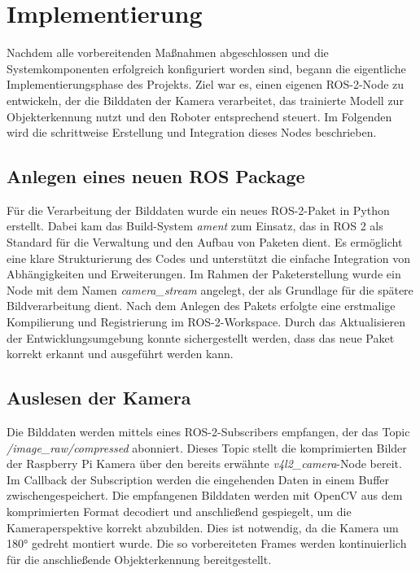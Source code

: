 \section{Implementierung}
Nachdem alle vorbereitenden Maßnahmen abgeschlossen und die Systemkomponenten erfolgreich konfiguriert worden sind, begann die eigentliche Implementierungsphase des Projekts. 
Ziel war es, einen eigenen ROS-2-Node zu entwickeln, der die Bilddaten der Kamera verarbeitet, das trainierte Modell zur Objekterkennung nutzt und den Roboter entsprechend steuert.
Im Folgenden wird die schrittweise Erstellung und Integration dieses Nodes beschrieben.
\subsection{Anlegen eines neuen ROS Package}
Für die Verarbeitung der Bilddaten wurde ein neues ROS-2-Paket in Python erstellt. 
Dabei kam das Build-System \textit{ament} zum Einsatz, das in ROS 2 als Standard für die Verwaltung und den Aufbau von Paketen dient. 
Es ermöglicht eine klare Strukturierung des Codes und unterstützt die einfache Integration von Abhängigkeiten und Erweiterungen. 
Im Rahmen der Paketerstellung wurde ein Node mit dem Namen \textit{camera\_stream} angelegt, der als Grundlage für die spätere Bildverarbeitung dient.
\newPar
Nach dem Anlegen des Pakets erfolgte eine erstmalige Kompilierung und Registrierung im ROS-2-Workspace. 
Durch das Aktualisieren der Entwicklungsumgebung konnte sichergestellt werden, dass das neue Paket korrekt erkannt und ausgeführt werden kann.
\subsection{Auslesen der Kamera}
Die Bilddaten werden mittels eines ROS-2-Subscribers empfangen, der das Topic \textit{/image\_raw/compressed} abonniert. 
Dieses Topic stellt die komprimierten Bilder der Raspberry Pi Kamera über den bereits erwähnte \textit{v4l2\_camera}-Node bereit. 
Im Callback der Subscription werden die eingehenden Daten in einem Buffer zwischengespeichert.
\newPar
Die empfangenen Bilddaten werden mit OpenCV aus dem komprimierten Format decodiert und anschließend gespiegelt, um die Kameraperspektive korrekt abzubilden.
Dies ist notwendig, da die Kamera um 180° gedreht montiert wurde.
Die so vorbereiteten Frames werden kontinuierlich für die anschließende Objekterkennung bereitgestellt.
